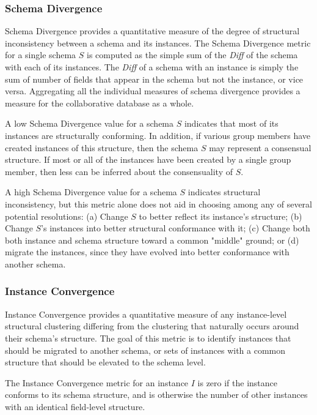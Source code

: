 \subsubsection{Schema Divergence}

Schema Divergence provides a quantitative measure of the degree of structural inconsistency between a schema and its instances.  The Schema Divergence metric for a single schema $S$ is computed as the simple sum of the {\em Diff}\/ of the schema with each of its instances.  The {\em Diff}\/ of a schema with an instance is simply the sum of number of fields that appear in the schema but not the instance, or vice versa. Aggregating all the individual measures of schema divergence provides a measure for the collaborative database as a whole.

A low Schema Divergence value for a schema $S$ indicates that most of its instances are structurally conforming.  In addition, if various group members have created instances of this structure, then the schema $S$ may represent a consensual structure.  If most or all of the instances have been created by a single group member, then less can be inferred about the consensuality of $S$.

A high Schema Divergence value for a schema $S$ indicates structural inconsistency, but this metric alone does not aid in choosing among any of several potential resolutions: (a) Change $S$ to better reflect its instance's structure; (b) Change $S$'s instances into better structural conformance with it; (c) Change both both instance and schema structure toward a common "middle" ground; or (d) migrate the instances, since they have evolved into better conformance with another schema.

\subsubsection{Instance Convergence}

Instance Convergence provides a quantitative measure of any instance-level structural clustering differing from the clustering that naturally occurs around their schema's structure.  The goal of this metric is to identify instances that should be migrated to another schema, or sets of instances with a common structure that should be elevated to the schema level.

The Instance Convergence metric for an instance $I$ is zero if the instance conforms to its schema structure, and is otherwise the number of other instances with an identical field-level structure.

